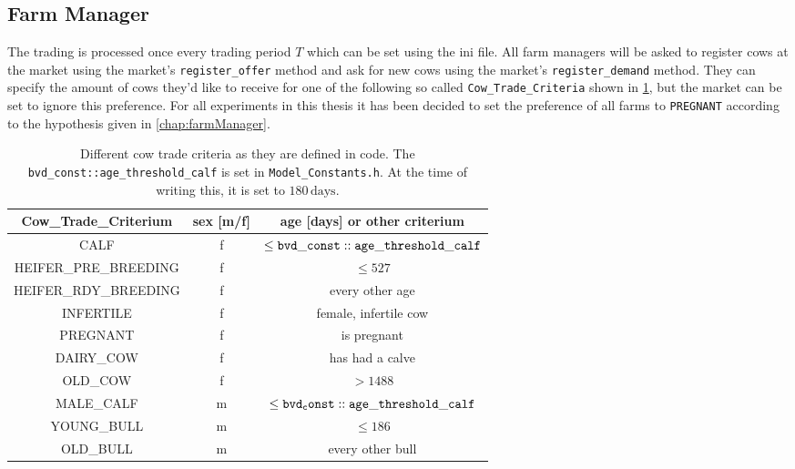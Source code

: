 \subsection{Farm Manager}
The trading is processed once every trading period $T$ which can be set using the ini file. All farm managers will be asked to register cows at the market using the market's {\tt register\_offer} method and ask for new cows using the market's {\tt register\_demand} method. They can specify the amount of cows they'd like to receive for one of the following so called {\tt Cow\_Trade\_Criteria} shown in \ref{tab:cowTradeCrit}, but the market can be set to ignore this preference. 
For all experiments in this thesis it has been decided to set the preference of all farms to {\tt PREGNANT} according to the hypothesis given in \ref{chap:farmManager}. 

\begin{table}[htb]%

    \begin{center}
    \begin{tabular}{|ccc|}\hline
        \rowcolor{dunkelgrau} Cow\_Trade\_Criterium  & sex [m/f] & age [days] or other criterium \\\hline
                              CALF  & f& $\leq {\tt bvd\_const::age\_threshold\_calf}$\\\hline
\rowcolor{hellgrau}           HEIFER\_PRE\_BREEDING  & f& $\leq 527$\footnotemark \\\hline
                              HEIFER\_RDY\_BREEDING  & f& every other age \\\hline
\rowcolor{hellgrau}           INFERTILE  & f& female, infertile cow \\\hline
                              PREGNANT  & f& is pregnant\\\hline
\rowcolor{hellgrau}           DAIRY\_COW  & f& has had a calve\\\hline 
                              OLD\_COW & f& $> 1488 $\\ \hline
\rowcolor{hellgrau}            MALE\_CALF &   m & $\leq {\tt bvd_const::age\_threshold\_calf}$   \\\hline
                               YOUNG\_BULL & m  &  $\leq 186$  \\\hline 
\rowcolor{hellgrau}           OLD\_BULL   &  m  & every other bull   \\\hline           
\end{tabular}

\caption{Different cow trade criteria as they are defined in code. The {\tt bvd\_const::age\_threshold\_calf} is set in {\tt Model\_Constants.h}. At the time of writing this, it is set to $ 180 \, \text{days} $.}
\label{tab:cowTradeCrit} 
\end{center}
\end{table}
